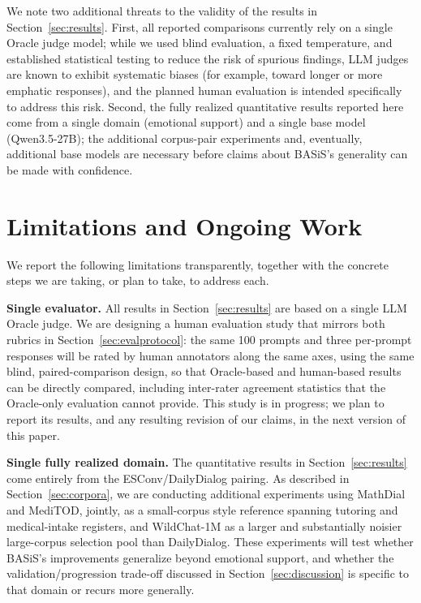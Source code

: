 \documentclass[manuscript,review,anonymous]{acmart}
\begin{document}
We note two additional threats to the validity of the results in Section~\ref{sec:results}. First, all reported comparisons currently rely on a single Oracle judge model; while we used blind evaluation, a fixed temperature, and established statistical testing to reduce the risk of spurious findings, LLM judges are known to exhibit systematic biases (for example, toward longer or more emphatic responses), and the planned human evaluation is intended specifically to address this risk. Second, the fully realized quantitative results reported here come from a single domain (emotional support) and a single base model (Qwen3.5-27B); the additional corpus-pair experiments and, eventually, additional base models are necessary before claims about BASiS's generality can be made with confidence.


\section{Limitations and Ongoing Work}
\label{sec:limitations}

We report the following limitations transparently, together with the concrete steps we are taking, or plan to take, to address each.

\textbf{Single evaluator.} All results in Section~\ref{sec:results} are based on a single LLM Oracle judge. We are designing a human evaluation study that mirrors both rubrics in Section~\ref{sec:evalprotocol}: the same 100 prompts and three per-prompt responses will be rated by human annotators along the same axes, using the same blind, paired-comparison design, so that Oracle-based and human-based results can be directly compared, including inter-rater agreement statistics that the Oracle-only evaluation cannot provide. This study is in progress; we plan to report its results, and any resulting revision of our claims, in the next version of this paper.

\textbf{Single fully realized domain.} The quantitative results in Section~\ref{sec:results} come entirely from the ESConv/DailyDialog pairing. As described in Section~\ref{sec:corpora}, we are conducting additional experiments using MathDial and MediTOD, jointly, as a small-corpus style reference spanning tutoring and medical-intake registers, and WildChat-1M as a larger and substantially noisier large-corpus selection pool than DailyDialog. These experiments will test whether BASiS's improvements generalize beyond emotional support, and whether the validation/progression trade-off discussed in Section~\ref{sec:discussion} is specific to that domain or recurs more generally.
\end{document}
